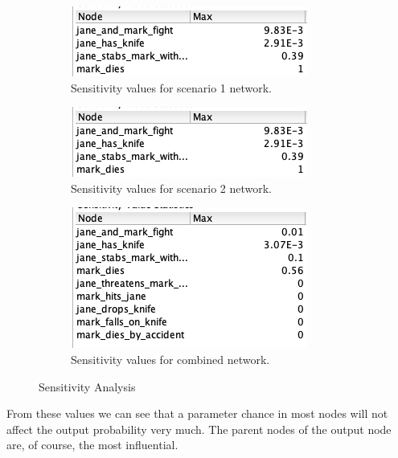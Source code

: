 \begin{enumerate}
\begin{figure}[htbp]
\begin{center}
\begin{subfigure}{.33\textwidth}
\includegraphics[width=0.9\linewidth]{images/sensitivityKB1.png}
\caption{Sensitivity values for scenario 1 network.}
\label{sa1}
\end{subfigure}%
\begin{subfigure}{.33\textwidth}
\includegraphics[width=0.9\linewidth]{images/sensitivityKB1.png}
\caption{ Sensitivity values for scenario 2 network.}
\label{sa2}
\end{subfigure}%
\begin{subfigure}{.33\textwidth}
\includegraphics[width=0.9\linewidth]{images/sensitivityKBFull.png}
\caption{Sensitivity values for combined network.}
\label{sa3}
\end{subfigure}
\end{center}
\caption{Sensitivity Analysis}
\label{sa}
\end{figure}

From these values we can see that a parameter chance in most nodes will not affect the output probability very much. The parent nodes of the output node are, of course, the most influential. 



\end{enumerate}

